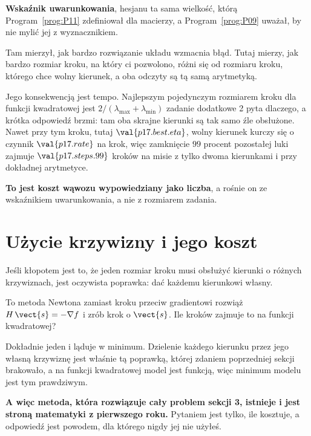 \begin{fr}
\begin{ansblock}
\textbf{Wskaźnik uwarunkowania}, hesjanu \dash{} ta sama wielkość, którą
Program~\ref{prog:P11} zdefiniował dla macierzy, a Program~\ref{prog:P09}
uważał, by nie mylić jej z wyznacznikiem.
\end{ansblock}

Tam mierzył, jak bardzo rozwiązanie układu wzmacnia błąd. Tutaj mierzy, jak
bardzo rozmiar kroku, na który ci pozwolono, różni się od rozmiaru kroku,
którego chce wolny kierunek, a oba odczyty są tą samą arytmetyką.

Jego konsekwencją jest tempo. Najlepszym pojedynczym rozmiarem kroku dla
funkcji kwadratowej jest $2/(\lambda_{\max} + \lambda_{\min})$ \dash{} zadanie
dodatkowe 2 pyta dlaczego, a krótka odpowiedź brzmi: tam oba skrajne kierunki
są tak samo źle obsłużone. Nawet przy tym kroku, tutaj $\val{p17.best.eta}$,
wolny kierunek kurczy się o czynnik $\val{p17.rate}$ na
krok, więc zamknięcie $99$ procent pozostałej luki zajmuje
$\val{p17.steps.99}$ kroków \dash{} na misie z tylko dwoma kierunkami i przy
dokładnej arytmetyce.

\textbf{To jest koszt wąwozu wypowiedziany jako liczba}, a rośnie on ze
wskaźnikiem uwarunkowania, a nie z rozmiarem zadania.
\end{fr}

\section{Użycie krzywizny i jego koszt}
\label{sec:P17-newton}

\begin{fr}
Jeśli kłopotem jest to, że jeden rozmiar kroku musi obsłużyć kierunki o różnych
krzywiznach, jest oczywista poprawka: dać każdemu kierunkowi własny.

To metoda Newtona \dash{} zamiast kroku przeciw gradientowi rozwiąż
$H\,\vect{s} = -\nabla f$ i zrób krok o $\vect{s}$. Ile kroków zajmuje to
na funkcji kwadratowej?
\nextframe
\end{fr}

\begin{fr}
Dokładnie jeden i ląduje w minimum. Dzielenie każdego kierunku przez jego
własną krzywiznę jest właśnie tą poprawką, której zdaniem poprzedniej sekcji
brakowało, a na funkcji kwadratowej model jest funkcją, więc minimum modelu
jest tym prawdziwym.

\textbf{A więc metoda, która rozwiązuje cały problem sekcji 3, istnieje i jest
stroną matematyki z pierwszego roku.} Pytaniem jest tylko, ile kosztuje, a
odpowiedź jest powodem, dla którego nigdy jej nie użyłeś.
\end{fr}

